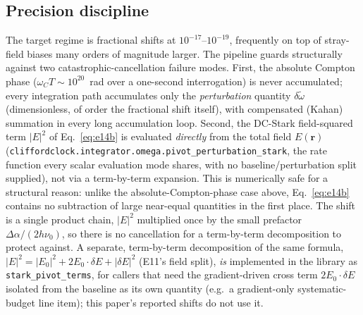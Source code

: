 \documentclass[aps,pra,superscriptaddress,groupedaddress,nofootinbib]{revtex4-2}
\begin{document}
\subsection{Precision discipline}
\label{sec:precision}

The target regime is fractional shifts at $10^{-17}$--$10^{-19}$,
frequently on top of stray-field biases many orders of magnitude
larger. The pipeline guards structurally
against two catastrophic-cancellation failure modes. First, the absolute
Compton phase ($\omega_C T \sim 10^{20}$~rad over a one-second
interrogation) is never accumulated; every integration path accumulates
only the \emph{perturbation} quantity $\delta\tilde\omega$ (dimensionless,
of order the fractional shift itself), with compensated (Kahan)
summation in every long accumulation loop. Second, the DC-Stark
field-squared term $|E|^2$ of Eq.~\eqref{eq:e14b} is evaluated
\emph{directly} from the total field $E(\mathbf{r})$
(\texttt{cliffordclock.integrator.omega.pivot\_perturbation\_stark}, the
rate function every scalar evaluation mode shares, with no
baseline/perturbation split supplied), not via a term-by-term expansion.
This is numerically safe for a structural reason:
unlike the absolute-Compton-phase case above, Eq.~\eqref{eq:e14b}
contains no subtraction of large near-equal quantities in the first
place. The shift is a single product chain, $|E|^2$ multiplied once by
the small prefactor $\Delta\alpha/(2h\nu_0)$, so there is no cancellation
for a term-by-term decomposition to protect against. A separate,
term-by-term decomposition of the same formula,
$|E|^2=|E_0|^2+2E_0\!\cdot\!\delta E+|\delta E|^2$ (E11's field split),
\emph{is} implemented in the library as
\texttt{stark\_pivot\_terms}, for callers that need the gradient-driven
cross term $2E_0\!\cdot\!\delta E$ isolated from the baseline as its own
quantity (e.g.\ a gradient-only systematic-budget line item); this
paper's reported shifts do not use it.
\end{document}
